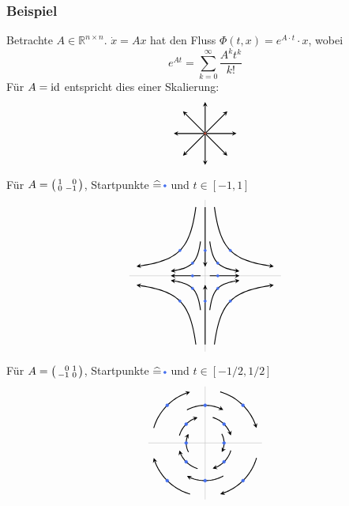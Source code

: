 \subsubsection[Beispiele für dynamische Systeme]{Beispiel} %
\label{ssub:252}
Betrachte $A \in \mathds{R}^{n \times n}$. $\dot x = A x$ hat den Fluss $\Phi(t,x) = e^{A \cdot t} \cdot  x$, wobei
\[
	e^{A t} = \sum_{k=0}^{\infty} \frac{A^k t^k}{k!}  
\]
Für $A= \operatorname{id}$ entspricht dies einer Skalierung:
\[
	\begin{tikzpicture}
		\foreach \x in {0,45,...,315}{
			\draw[arrows={-stealth}, thick] (0,0) -- (\x:1);
		}
		\draw[fill, Tomato3] (0,0) circle (0.03);
	\end{tikzpicture}
\]
Für $A = \begin{psmallmatrix*}[r]
	1 & 0 \\
	0 & -1
\end{psmallmatrix*}$, Startpunkte $\widehat{=}\,{\tikz[baseline=-0.5ex]{\draw[fill, RoyalBlue2] (0,0) circle[radius=0.04]}}$ und $t \in [-1, 1]$
\[
	\begin{tikzpicture}[scale=0.8]
		\draw[Gray0] (-3,0) -- (3,0);
		\draw[Gray0] (0,-3) -- (0,3);
		\begin{scope}
		\foreach \x/\y in {1/1, -1/-1, 1/-1, -1/1, 0.5/0.5, -0.5/-0.5, -0.5/0.5, 0.5/-0.5, 0/1, 0/-1, 0.5/0, -0.5/0}{
			\draw[thick, domain=-1:1, smooth, variable=\t, arrows={-stealth}] plot ({exp(\t)*\x},{exp(-\t)*\y});
			\draw[fill, RoyalBlue2] (\x,\y) circle[radius=0.05];
		}
		\end{scope}
	\end{tikzpicture}
\]
Für $A = \begin{psmallmatrix*}[r]
	0 & 1 \\
	-1 & 0
\end{psmallmatrix*}$, Startpunkte $\widehat{=}\,{\tikz[baseline=-0.5ex]{\draw[fill, RoyalBlue2] (0,0) circle[radius=0.04]}}$ und $t \in [-1/2, 1/2]$
\[
	\begin{tikzpicture}[scale=1.2]
		\draw[Gray0] (-1.5,0) -- (1.5,0);
		\draw[Gray0] (0,-1.5) -- (0,1.5);
		\begin{scope}
		\foreach \x/\y in {1/1, -1/-1, 1/-1, -1/1, 0.5/0.5, -0.5/-0.5, -0.5/0.5, 0.5/-0.5, 0/1, 0/-1, 0.5/0, -0.5/0}{
			\draw[thick, domain=-0.5:0.5, variable=\t, arrows={-stealth}] 
			plot ({\x*cos(deg(\t))+ \y*sin(deg(\t))},{-\x*sin(deg(\t))+ \y*cos(deg(\t))});
			\draw[fill, RoyalBlue2] (\x,\y) circle[radius=0.04];
		}
		\end{scope}
	\end{tikzpicture}
\]
